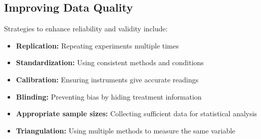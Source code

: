 
\subsection{Improving Data Quality}

Strategies to enhance reliability and validity include:

\begin{itemize}
    \item \textbf{Replication:} Repeating experiments multiple times
    
    \item \textbf{Standardization:} Using consistent methods and conditions
    
    \item \textbf{Calibration:} Ensuring instruments give accurate readings
    
    \item \textbf{Blinding:} Preventing bias by hiding treatment information
    
    \item \textbf{Appropriate sample sizes:} Collecting sufficient data for statistical analysis
    
    \item \textbf{Triangulation:} Using multiple methods to measure the same variable
\end{itemize}

